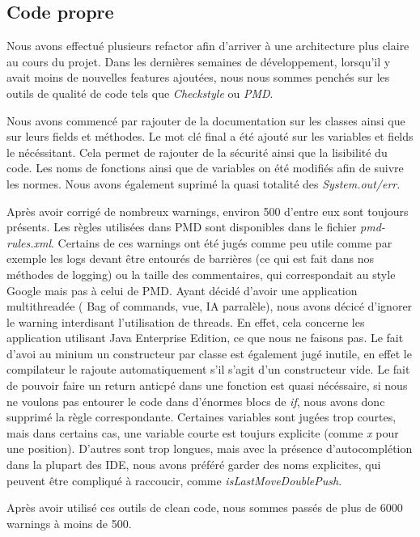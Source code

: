 \documentclass{article}
\begin{document}
\subsection{Code propre}
Nous avons effectué plusieurs refactor afin d'arriver à une architecture plus claire au cours du projet. Dans les dernières semaines de développement, 
lorsqu'il y avait moins de nouvelles features ajoutées, nous nous sommes penchés sur les outils de qualité de code tels que \textit{Checkstyle} ou \textit{PMD}.

Nous avons commencé par rajouter de la documentation sur les classes ainsi que sur leurs fields et méthodes. 
Le mot clé final a été ajouté sur les variables et fields le nécéssitant. Cela permet de rajouter de la sécurité ainsi que la lisibilité du code.
Les noms de fonctions ainsi que de variables on été modifiés afin de suivre les normes. Nous avons également suprimé la quasi totalité des \textit{System.out/err}.

Après avoir corrigé de nombreux warnings, environ 500 d'entre eux sont toujours présents.
Les règles utilisées dans PMD sont disponibles dans le fichier \textit{pmd-rules.xml}.
Certains de ces warnings ont été jugés 
comme peu utile comme par exemple les logs devant être entourés de barrières (ce qui est fait dans nos méthodes de logging) ou la taille des commentaires,
qui correspondait au style Google mais pas à celui de PMD. 
Ayant décidé d'avoir une application multithreadée ( Bag of commands, vue, IA parralèle), nous avons décicé d'ignorer le warning interdisant l'utilisation de threads.
En effet, cela concerne les application utilisant Java Enterprise Edition, ce que nous ne faisons pas.
Le fait d'avoi au minium un constructeur par classe est également jugé inutile, en effet le compilateur le rajoute automatiquement s'il s'agit d'un constructeur vide.
Le fait de pouvoir faire un return anticpé dans une fonction est quasi nécéssaire, si nous ne voulons pas entourer le code dans 
d'énormes blocs de \textit{if}, nous avons donc supprimé la règle correspondante.
Certaines variables sont jugées trop courtes, mais dans certains cas, une variable courte est toujurs explicite (comme \textit{x} pour une position). 
D'autres sont trop longues, mais avec la présence d'autocomplétion dans la plupart des IDE, nous avons préféré garder des noms explicites, qui peuvent être compliqué à raccoucir,
comme \textit{isLastMoveDoublePush}.

Après avoir utilisé ces outils de clean code, nous sommes passés de plus de 6000 warnings à moins de 500.
\end{document}
